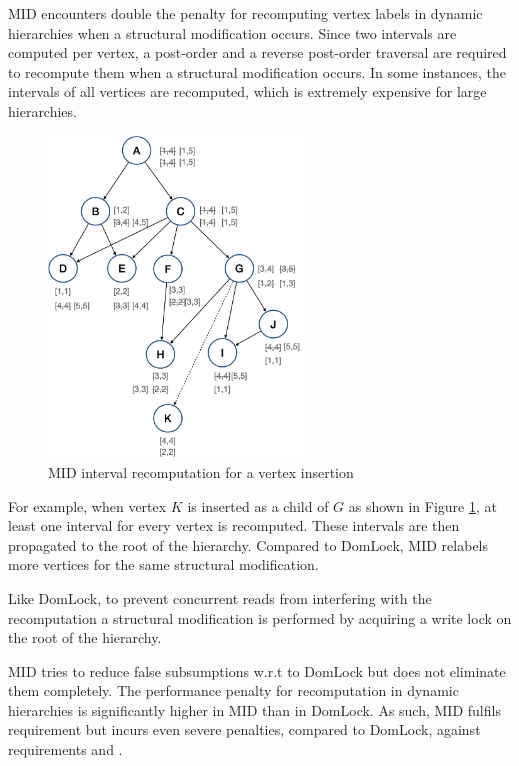 MID encounters double the penalty for recomputing vertex labels in dynamic hierarchies when a structural modification occurs. Since two intervals are computed per vertex, a post-order and a reverse post-order traversal are required to recompute them when a structural modification occurs. In some instances, the intervals of all vertices are recomputed, which is extremely expensive for large hierarchies.

\begin{figure}[H]
    \centering
    \captionsetup{justification=centering}
    \includegraphics[width=0.6\textwidth]{figures/MID_example_with_SM.png}
    \caption{MID interval recomputation for a vertex insertion}
    \label{fig:MID_example_SM}
    
\end{figure}

For example, when vertex $K$ is inserted as a child of $G$ as shown in Figure \ref{fig:MID_example_SM}, at least one interval for every vertex is recomputed. These intervals are then propagated to the root of the hierarchy. Compared to DomLock, MID relabels more vertices for the same structural modification. 


Like DomLock, to prevent concurrent reads from interfering with the recomputation a structural modification is performed by acquiring a write lock on the root of the hierarchy.


MID tries to reduce false subsumptions w.r.t to DomLock but does not eliminate them completely. The performance penalty for recomputation in dynamic hierarchies is significantly higher in MID than in DomLock. As such, MID fulfils requirement \Rb but incurs even severe penalties, compared to DomLock, against requirements \Rc and \Rd.

